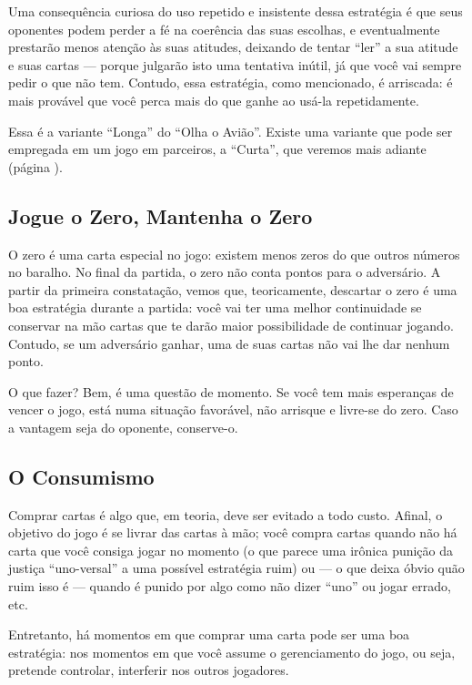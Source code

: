 Uma consequência curiosa do uso repetido e insistente dessa estratégia é que seus oponentes podem perder a fé na coerência das suas escolhas, e eventualmente prestarão menos atenção às suas atitudes, deixando de tentar ``ler'' a sua atitude e suas cartas --- porque julgarão isto uma tentativa inútil, já que você vai sempre pedir o que não tem. Contudo, essa estratégia, como mencionado, é arriscada: é mais provável que você perca mais do que ganhe ao usá-la repetidamente.

Essa é a variante ``Longa'' do ``Olha o Avião''. Existe uma variante que pode ser empregada em um jogo em parceiros, a ``Curta'', que veremos mais adiante (página \pageref{aviaocurto}).

\subsection{Jogue o Zero, Mantenha o Zero}

O zero é uma carta especial no jogo: existem menos zeros do que outros números no baralho. No final da partida, o zero não conta pontos para o adversário. A partir da primeira constatação, vemos que, teoricamente, descartar o zero é uma boa estratégia durante a partida: você vai ter uma melhor continuidade se conservar na mão cartas que te darão maior possibilidade de continuar jogando. Contudo, se um adversário ganhar, uma de suas cartas não vai lhe dar nenhum ponto.

O que fazer? Bem, é uma questão de momento. Se você tem mais esperanças de vencer o jogo, está numa situação favorável, não arrisque e livre-se do zero. Caso a vantagem seja do oponente, conserve-o.

\subsection{O Consumismo}

\label{consumismo}

Comprar cartas é algo que, em teoria, deve ser evitado a todo custo. Afinal, o objetivo do jogo é se livrar das cartas à mão; você compra cartas quando não há carta que você consiga jogar no momento (o que parece uma irônica punição da justiça ``uno-versal'' a uma possível estratégia ruim) ou --- o que deixa óbvio quão ruim isso é --- quando é punido por algo como não dizer ``uno'' ou jogar errado, etc.

Entretanto, há momentos em que comprar uma carta pode ser uma boa estratégia: nos momentos em que você assume o gerenciamento do jogo, ou seja, pretende controlar, interferir nos outros jogadores.

